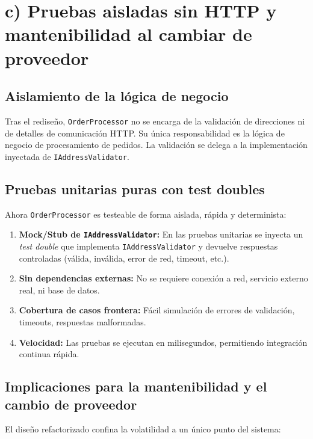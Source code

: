 \section{c) Pruebas aisladas sin HTTP y mantenibilidad al cambiar de proveedor}

\subsection*{Aislamiento de la lógica de negocio}

Tras el rediseño, \texttt{OrderProcessor} no se encarga de la validación de direcciones ni de detalles de comunicación HTTP. Su única responsabilidad es la lógica de negocio de procesamiento de pedidos. La validación se delega a la implementación inyectada de \texttt{IAddressValidator}.

\subsection*{Pruebas unitarias puras con test doubles}

Ahora \texttt{OrderProcessor} es testeable de forma aislada, rápida y determinista:

\begin{enumerate}
    \item \textbf{Mock/Stub de \texttt{IAddressValidator}:} En las pruebas unitarias se inyecta un \textit{test double} que implementa \texttt{IAddressValidator} y devuelve respuestas controladas (válida, inválida, error de red, timeout, etc.).
    \item \textbf{Sin dependencias externas:} No se requiere conexión a red, servicio externo real, ni base de datos.
    \item \textbf{Cobertura de casos frontera:} Fácil simulación de errores de validación, timeouts, respuestas malformadas.
    \item \textbf{Velocidad:} Las pruebas se ejecutan en milisegundos, permitiendo integración continua rápida.
\end{enumerate}

\subsection*{Implicaciones para la mantenibilidad y el cambio de proveedor}

El diseño refactorizado confina la volatilidad a un único punto del sistema:


